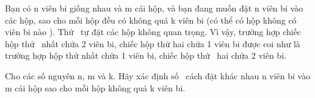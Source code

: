 Bạn có n viên bi giống nhau và m cái hộp, và bạn đang muốn đặt n viên bi vào các hộp, sao cho mỗi hộp đều có không quá k viên bi (có thể có hộp không có viên bi nào ). Thứ  tự đặt các hộp không quan trọng. Vì vậy, trường hợp chiếc hộp thứ  nhất chứa 2 viên bi, chiếc hộp thứ hai chứa 1 viên bi được coi như là trường hợp hộp thứ nhất chứa 1 viên bi, chiếc hộp thứ  hai chứa 2 viên bi.  

   Cho các số nguyên n, m và k. Hãy xác định số  cách đặt khác nhau n viên bi vào m cái hộp sao cho mỗi hộp không quá k viên bi.  

\